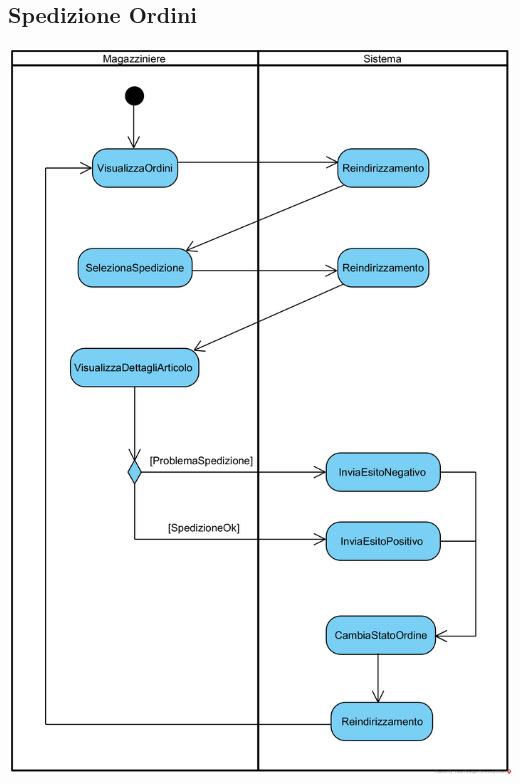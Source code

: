\documentclass[12pt,a4paper]{article}
\begin{document}
\subsection{Spedizione Ordini}
\begin{center}
\includegraphics[height=0.95\textheight]{ActivityDiagram/SpedizioneOrdine}
\end{center}
\end{document}
